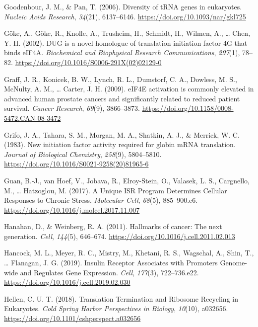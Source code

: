 \documentclass[12pt,openany]{book}
\begin{document}
\hypertarget{ref-Goodenbour2006}{}
Goodenbour, J. M., \& Pan, T. (2006). Diversity of tRNA genes in
eukaryotes. \emph{Nucleic Acids Research}, \emph{34}(21), 6137--6146.
\url{https://doi.org/10.1093/nar/gkl725}

\hypertarget{ref-Goke2002}{}
Göke, A., Göke, R., Knolle, A., Trusheim, H., Schmidt, H., Wilmen, A.,
\ldots{} Chen, Y. H. (2002). DUG is a novel homologue of translation
initiation factor 4G that binds eIF4A. \emph{Biochemical and Biophysical
Research Communications}, \emph{297}(1), 78--82.
\url{https://doi.org/10.1016/S0006-291X(02)02129-0}

\hypertarget{ref-Graff2009}{}
Graff, J. R., Konicek, B. W., Lynch, R. L., Dumstorf, C. A., Dowless, M.
S., McNulty, A. M., \ldots{} Carter, J. H. (2009). eIF4E activation is
commonly elevated in advanced human prostate cancers and significantly
related to reduced patient survival. \emph{Cancer Research},
\emph{69}(9), 3866--3873.
\url{https://doi.org/10.1158/0008-5472.CAN-08-3472}

\hypertarget{ref-Grifo1983}{}
Grifo, J. A., Tahara, S. M., Morgan, M. A., Shatkin, A. J., \& Merrick,
W. C. (1983). New initiation factor activity required for globin mRNA
translation. \emph{Journal of Biological Chemistry}, \emph{258}(9),
5804--5810. \url{https://doi.org/10.1016/S0021-9258(20)81965-6}

\hypertarget{ref-Guan2017}{}
Guan, B.-J., van Hoef, V., Jobava, R., Elroy-Stein, O., Valasek, L. S.,
Cargnello, M., \ldots{} Hatzoglou, M. (2017). A Unique ISR Program
Determines Cellular Responses to Chronic Stress. \emph{Molecular Cell},
\emph{68}(5), 885--900.e6.
\url{https://doi.org/10.1016/j.molcel.2017.11.007}

\hypertarget{ref-Hanahan2011}{}
Hanahan, D., \& Weinberg, R. A. (2011). Hallmarks of cancer: The next
generation. \emph{Cell}, \emph{144}(5), 646--674.
\url{https://doi.org/10.1016/j.cell.2011.02.013}

\hypertarget{ref-Hancock2019}{}
Hancock, M. L., Meyer, R. C., Mistry, M., Khetani, R. S., Wagschal, A.,
Shin, T., \ldots{} Flanagan, J. G. (2019). Insulin Receptor Associates
with Promoters Genome-wide and Regulates Gene Expression. \emph{Cell},
\emph{177}(3), 722--736.e22.
\url{https://doi.org/10.1016/j.cell.2019.02.030}

\hypertarget{ref-Hellen2018}{}
Hellen, C. U. T. (2018). Translation Termination and Ribosome Recycling
in Eukaryotes. \emph{Cold Spring Harbor Perspectives in Biology},
\emph{10}(10), a032656.
\url{https://doi.org/10.1101/cshperspect.a032656}
\end{document}
